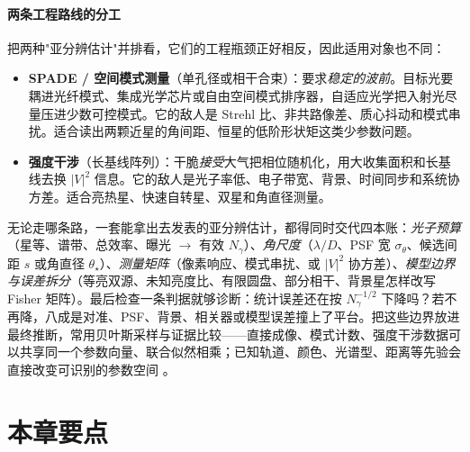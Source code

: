 \paragraph{两条工程路线的分工}
\label{sec:e12-two-roads}

把两种"亚分辨估计"并排看，它们的工程瓶颈正好相反，因此适用对象也不同：

\begin{itemize}
  \item \textbf{SPADE / 空间模式测量}（单孔径或相干合束）：要求\emph{稳定的波前}。目标光要耦进光纤模式、集成光学芯片或自由空间模式排序器，自适应光学把入射光尽量压进少数可控模式。它的敌人是 Strehl 比、非共路像差、质心抖动和模式串扰。适合读出两颗近星的角间距、恒星的低阶形状矩这类少参数问题。
  \item \textbf{强度干涉}（长基线阵列）：干脆\emph{接受}大气把相位随机化，用大收集面积和长基线去换 \(|V|^2\) 信息。它的敌人是光子率低、电子带宽、背景、时间同步和系统协方差。适合亮热星、快速自转星、双星和角直径测量。
\end{itemize}

无论走哪条路，一套能拿出去发表的亚分辨估计，都得同时交代四本账：\emph{光子预算}（星等、谱带、总效率、曝光 \(\to\) 有效 \(N_\gamma\)）、\emph{角尺度}（\(\lambda/D\)、PSF 宽 \(\sigma_\theta\)、候选间距 \(s\) 或角直径 \(\theta_\star\)）、\emph{测量矩阵}（像素响应、模式串扰、或 \(|V|^2\) 协方差）、\emph{模型边界与误差拆分}（等亮双源、未知亮度比、有限圆盘、部分相干、背景星怎样改写 Fisher 矩阵）。最后检查一条判据就够诊断：统计误差还在按 \(N_\gamma^{-1/2}\) 下降吗？若不再降，八成是对准、PSF、背景、相关器或模型误差撞上了平台。把这些边界放进最终推断，常用贝叶斯采样与证据比较——直接成像、模式计数、强度干涉数据可以共享同一个参数向量、联合似然相乘；已知轨道、颜色、光谱型、距离等先验会直接改变可识别的参数空间 \citep{2009MNRAS.398.1601F,2013PASP..125..306F}。


\section{本章要点}
\label{sec:e12-summary}

